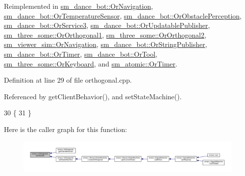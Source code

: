 Reimplemented in \hyperlink{classsm__dance__bot_1_1OrNavigation_a9f87c78f5af67024c9eda25097a135ac}{sm\+\_\+dance\+\_\+bot\+::\+Or\+Navigation}, \hyperlink{classsm__dance__bot_1_1OrTemperatureSensor_a2e944e459a695774dcf7fdbd5ac93b01}{sm\+\_\+dance\+\_\+bot\+::\+Or\+Temperature\+Sensor}, \hyperlink{classsm__dance__bot_1_1OrObstaclePerception_a4597fbab143e9bc3e350dfa730242a08}{sm\+\_\+dance\+\_\+bot\+::\+Or\+Obstacle\+Perception}, \hyperlink{classsm__dance__bot_1_1OrService3_a394d93c4a340257b8b1b941adeed8cd9}{sm\+\_\+dance\+\_\+bot\+::\+Or\+Service3}, \hyperlink{classsm__dance__bot_1_1OrUpdatablePublisher_a7de06135fd7ddea74ad9bb547fb6e79a}{sm\+\_\+dance\+\_\+bot\+::\+Or\+Updatable\+Publisher}, \hyperlink{classsm__three__some_1_1OrOrthogonal1_ad9dec970afcae7347e3bf2e48e7f8314}{sm\+\_\+three\+\_\+some\+::\+Or\+Orthogonal1}, \hyperlink{classsm__three__some_1_1OrOrthogonal2_a97037952a7372ce6cdb920b1b1c0b72c}{sm\+\_\+three\+\_\+some\+::\+Or\+Orthogonal2}, \hyperlink{classsm__viewer__sim_1_1OrNavigation_a6f39ecbb3c1ad253c283588df860a8c4}{sm\+\_\+viewer\+\_\+sim\+::\+Or\+Navigation}, \hyperlink{classsm__dance__bot_1_1OrStringPublisher_a61cf6dcd0726eb1191dd0a110237968e}{sm\+\_\+dance\+\_\+bot\+::\+Or\+String\+Publisher}, \hyperlink{classsm__dance__bot_1_1OrTimer_aa0091c17ca7ff4c71badd03085272cc4}{sm\+\_\+dance\+\_\+bot\+::\+Or\+Timer}, \hyperlink{classsm__dance__bot_1_1OrTool_a78a07c94234ff0e07450b1e5115fb6a8}{sm\+\_\+dance\+\_\+bot\+::\+Or\+Tool}, \hyperlink{classsm__three__some_1_1OrKeyboard_af49faa7c511ae0232ed0931ce8c85b56}{sm\+\_\+three\+\_\+some\+::\+Or\+Keyboard}, and \hyperlink{classsm__atomic_1_1OrTimer_a509b0d9ce7c6ed9e0c291decaf6dd280}{sm\+\_\+atomic\+::\+Or\+Timer}.



Definition at line 29 of file orthogonal.\+cpp.



Referenced by get\+Client\+Behavior(), and set\+State\+Machine().


\begin{DoxyCode}
30 \{
31 \}
\end{DoxyCode}


Here is the caller graph for this function\+:
\nopagebreak
\begin{figure}[H]
\begin{center}
\leavevmode
\includegraphics[width=350pt]{classsmacc_1_1Orthogonal_a7a3da420b1554e20aea3ed01067df05c_icgraph}
\end{center}
\end{figure}


